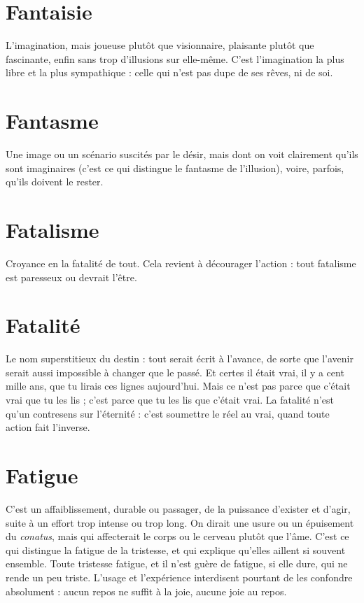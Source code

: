 \section{Fantaisie}
L’imagination, mais joueuse plutôt que visionnaire, plaisante
plutôt que fascinante, enfin sans trop d'illusions sur elle-même.
C’est l'imagination la plus libre et la plus sympathique : celle qui n’est pas dupe
de ses rêves, ni de soi.

\section{Fantasme}
Une image ou un scénario suscités par le désir, mais dont on
voit clairement qu’ils sont imaginaires (c’est ce qui distingue le
fantasme de l'illusion), voire, parfois, qu’ils doivent le rester.

\section{Fatalisme}
Croyance en la fatalité de tout. Cela revient à décourager
l’action : tout fatalisme est paresseux ou devrait l'être.

\section{Fatalité}
Le nom superstitieux du destin : tout serait écrit à l'avance, de
sorte que l'avenir serait aussi impossible à changer que le passé.
Et certes il était vrai, il y a cent mille ans, que tu lirais ces lignes aujourd’hui.
Mais ce n’est pas parce que c'était vrai que tu les lis ; c’est parce que tu les lis
que c'était vrai. La fatalité n’est qu’un contresens sur l’éternité : c’est soumettre
le réel au vrai, quand toute action fait l'inverse.

\section{Fatigue}
C’est un affaiblissement, durable ou passager, de la puissance
d’exister et d’agir, suite à un effort trop intense ou trop long. On
dirait une usure ou un épuisement du {\it conatus}, mais qui affecterait le corps ou
le cerveau plutôt que l’âme. C’est ce qui distingue la fatigue de la tristesse, et
qui explique qu’elles aillent si souvent ensemble. Toute tristesse fatigue, et il
n'est guère de fatigue, si elle dure, qui ne rende un peu triste. L'usage et l’expérience
interdisent pourtant de les confondre absolument : aucun repos ne suffit
à la joie, aucune joie au repos.

